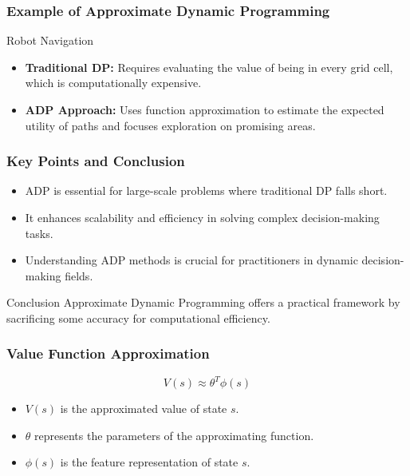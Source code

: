 \documentclass[aspectratio=169]{beamer}
\begin{document}
\begin{frame}[fragile]
    \frametitle{Example of Approximate Dynamic Programming}
    \begin{block}{Robot Navigation}
        \begin{itemize}
            \item \textbf{Traditional DP:} Requires evaluating the value of being in every grid cell, which is computationally expensive.
            \item \textbf{ADP Approach:} Uses function approximation to estimate the expected utility of paths and focuses exploration on promising areas.
        \end{itemize}
    \end{block}
\end{frame}

\begin{frame}[fragile]
    \frametitle{Key Points and Conclusion}
    \begin{itemize}
        \item ADP is essential for large-scale problems where traditional DP falls short.
        \item It enhances scalability and efficiency in solving complex decision-making tasks.
        \item Understanding ADP methods is crucial for practitioners in dynamic decision-making fields.
    \end{itemize}
    \begin{block}{Conclusion}
        Approximate Dynamic Programming offers a practical framework by sacrificing some accuracy for computational efficiency.
    \end{block}
\end{frame}

\begin{frame}[fragile]
    \frametitle{Value Function Approximation}
    \begin{equation}
        V(s) \approx \theta^T \phi(s)
    \end{equation}
    \begin{itemize}
        \item \( V(s) \) is the approximated value of state \( s \).
        \item \( \theta \) represents the parameters of the approximating function.
        \item \( \phi(s) \) is the feature representation of state \( s \).
    \end{itemize}
\end{frame}
\end{document}
